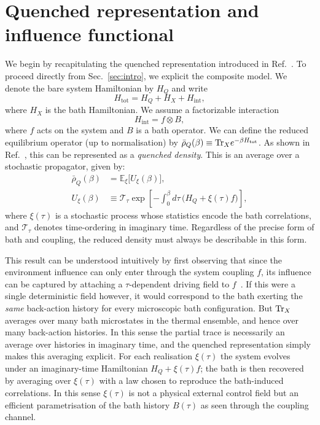 ﻿%
\section{Quenched representation and influence functional\label{sec:quenched}\label{sec:model}}
We begin by recapitulating the quenched representation introduced in Ref.~\cite{mccaulMeanForceHamiltoniansInfluence2026}.
To proceed directly from Sec.~\ref{sec:intro}, we explicit the composite model.
We denote the bare system Hamiltonian by $H_Q$ and write
\begin{equation}
    H_{\mathrm{tot}} = H_Q + H_X + H_{\mathrm{int}},
    \label{eq:Htot_split_sec3}
\end{equation}
where $H_X$ is the bath Hamiltonian. We assume a factorizable interaction
\begin{equation}
    H_{\mathrm{int}} = f \otimes B,
    \label{eq:Hint_general_f_B}
\end{equation}
where $f$ acts on the system and $B$ is a bath operator. We can define the reduced equilibrium operator (up to normalisation) by $\bar{\rho}_Q(\beta)\equiv \mathrm{Tr}_X e^{-\beta H_{\mathrm{tot}}}$. As shown in Ref.~\cite{mccaulMeanForceHamiltoniansInfluence2026}, this can be represented as a \emph{quenched density}. This is an average over a stochastic propagator, given by:
\begin{align}
    \bar{\rho}_Q(\beta) &= \mathbb E_\xi\big[U_\xi(\beta)\big],
    \label{eq:quenched_identity_main}\\
    U_\xi(\beta) &\equiv \mathcal T_\tau \exp\!\left[-\int_0^\beta d\tau\,\big(H_Q+\xi(\tau)f\big)\right],
    \label{eq:quenched_propagator_sec3}
\end{align}
where $\xi(\tau)$ is a stochastic process whose statistics encode the bath correlations, and $ \mathcal T_\tau$ denotes time-ordering in imaginary time. Regardless of the precise form of bath and coupling, the reduced density must always be describable in this form. 

This result can be understood intuitively by first observing that since the environment influence can only enter through the system coupling $f$, its influence can be captured by attaching a $\tau$-dependent driving field to $f$~\cite{huQuantumBrownianMotion1992,mccaulHowWinFriends2021b}. If this were a single deterministic field however, it would correspond to the bath exerting the \emph{same} back-action history for every microscopic bath configuration. But $\mathrm{Tr}_X$ averages over many bath microstates in the thermal ensemble, and hence over many back-action histories. In this sense the partial trace is necessarily an average over histories in imaginary time, and the quenched representation simply makes this averaging explicit. For each realisation $\xi(\tau)$ the system evolves under an imaginary-time Hamiltonian $H_Q+\xi(\tau)f$; the bath is then recovered by averaging over $\xi(\tau)$ with a law chosen to reproduce the bath-induced correlations. In this sense $\xi(\tau)$ is not a physical external control field but an efficient parametrisation of the bath history $B(\tau)$ as seen through the coupling channel. 


